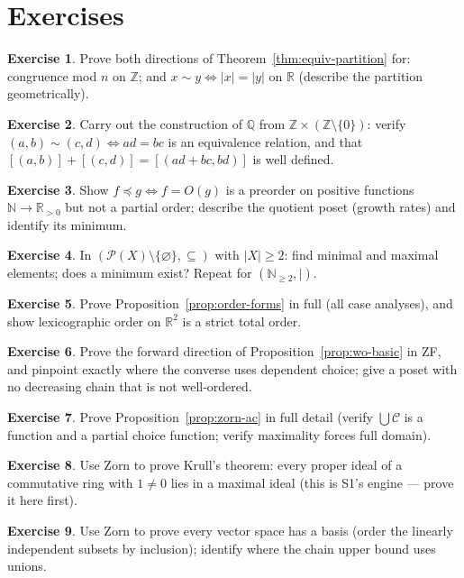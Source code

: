 \documentclass[11pt,a4paper]{article}
\theoremstyle{definition}
\newtheorem{exercise}{Exercise}
\newcommand{\Z}{\mathbb{Z}}
\newcommand{\Q}{\mathbb{Q}}
\newcommand{\R}{\mathbb{R}}
\newcommand{\N}{\mathbb{N}}
\newcommand{\Pow}{\mathcal{P}}
\begin{document}
\section{Exercises}
\begin{exercise}
Prove both directions of Theorem~\ref{thm:equiv-partition} for: congruence mod $n$ on $\Z$; and
$x\sim y\iff |x|=|y|$ on $\R$ (describe the partition geometrically).
\end{exercise}
\begin{exercise}
Carry out the construction of $\Q$ from $\Z\times(\Z\setminus\{0\})$: verify $(a,b)\sim(c,d)\iff ad=bc$
is an equivalence relation, and that $[(a,b)]+[(c,d)]=[(ad+bc,bd)]$ is well defined.
\end{exercise}
\begin{exercise}
Show $f\preceq g\iff f=O(g)$ is a preorder on positive functions $\N\to\R_{>0}$ but not a partial
order; describe the quotient poset (growth rates) and identify its minimum.
\end{exercise}
\begin{exercise}
In $(\Pow(X)\setminus\{\varnothing\},\subseteq)$ with $|X|\ge2$: find minimal and maximal elements;
does a minimum exist? Repeat for $(\N_{\ge2},\mid)$.
\end{exercise}
\begin{exercise}
Prove Proposition~\ref{prop:order-forms} in full (all case analyses), and show lexicographic order on
$\R^2$ is a strict total order.
\end{exercise}
\begin{exercise}
Prove the forward direction of Proposition~\ref{prop:wo-basic} in ZF, and pinpoint exactly where the
converse uses dependent choice; give a poset with no decreasing chain that is not well-ordered.
\end{exercise}
\begin{exercise}
Prove Proposition~\ref{prop:zorn-ac} in full detail (verify $\bigcup\mathcal C$ is a function and a
partial choice function; verify maximality forces full domain).
\end{exercise}
\begin{exercise}
Use Zorn to prove Krull's theorem: every proper ideal of a commutative ring with $1\neq0$ lies in a
maximal ideal (this is S1's engine --- prove it here first).
\end{exercise}
\begin{exercise}
Use Zorn to prove every vector space has a basis (order the linearly independent subsets by
inclusion); identify where the chain upper bound uses unions.
\end{exercise}
\end{document}

